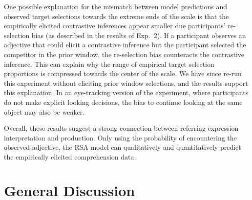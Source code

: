 \documentclass[10pt,letterpaper]{article}
\begin{document}
One possible explanation for the mismatch between model predictions and observed target selections towards the extreme ends of the scale is that the empirically elicited contrastive inferences appear smaller due participants' re-selection bias (as described in the results of Exp.~2). If a participant observes an adjective that could elicit a contrastive inference but the participant selected the competitor in the prior window, the re-selection bias counteracts the contrastive inference. This can explain why the range of empirical target selection proportions is compressed towards the center of the scale. We have since re-run this experiment without eliciting prior window selections, and the results support this explanation. In an eye-tracking version of the experiment, where participants do not make explicit looking decisions, the bias to continue looking at the same object may also be weaker.


Overall, these results suggest a strong connection between referring expression interpretation and production. Only using the probability of encountering the observed adjective, the RSA model can qualitatively and quantitatively predict the empirically elicited comprehension data. 


\section{General Discussion}
\end{document}
